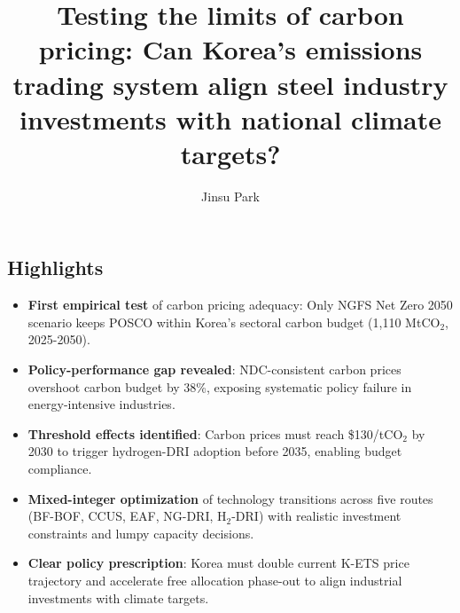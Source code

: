 \documentclass[preprint,1p,authoryear]{elsarticle}
\begin{document}
\begin{frontmatter}
\title{Testing the limits of carbon pricing: Can Korea's emissions trading system align steel industry investments with national climate targets?}

\author[planit]{Jinsu Park}
\address[planit]{PLANiT Institute, Seoul, Republic of Korea}


\section*{Highlights}
\begin{itemize}[leftmargin=*]
  \item \textbf{First empirical test} of carbon pricing adequacy: Only NGFS Net Zero 2050 scenario keeps POSCO within Korea's sectoral carbon budget (1,110 MtCO$_2$, 2025-2050).
  \item \textbf{Policy-performance gap revealed}: NDC-consistent carbon prices overshoot carbon budget by 38\%, exposing systematic policy failure in energy-intensive industries.
  \item \textbf{Threshold effects identified}: Carbon prices must reach \$130/tCO$_2$ by 2030 to trigger hydrogen-DRI adoption before 2035, enabling budget compliance.
  \item \textbf{Mixed-integer optimization} of technology transitions across five routes (BF-BOF, CCUS, EAF, NG-DRI, H$_2$-DRI) with realistic investment constraints and lumpy capacity decisions.
  \item \textbf{Clear policy prescription}: Korea must double current K-ETS price trajectory and accelerate free allocation phase-out to align industrial investments with climate targets.
\end{itemize}


\end{frontmatter}
\end{document}
